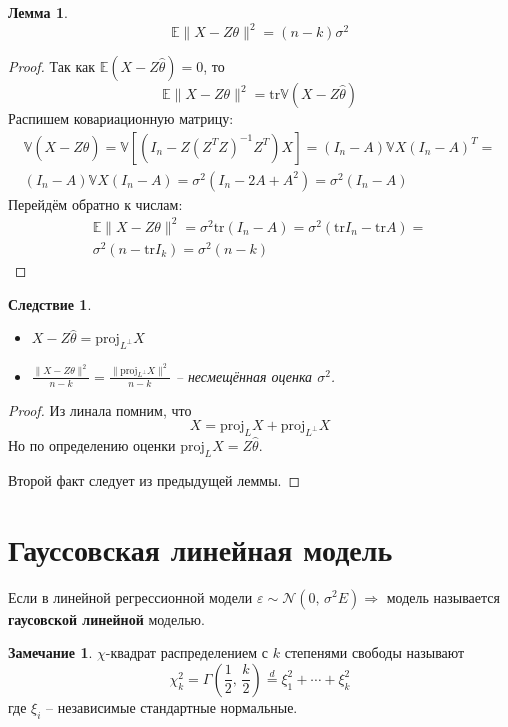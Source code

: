 \documentclass[a4paper,12pt]{article}
\theoremstyle{plain}
\newtheorem{lemma}{Лемма}[section]
\newtheorem*{corollary}{Следствие}
\theoremstyle{definition}
\newtheorem*{note}{Замечание}
\theoremstyle{remark}
\begin{document}
\begin{lemma}
  \[
    \mathbb{E}\|X - Z\theta\|^2 = (n - k)\sigma^2
  \]
\end{lemma}

\begin{proof}
  Так как $\mathbb{E}(X - Z\hat{\theta}) = 0$, то
  \[
    \mathbb{E}\|X - Z\theta\|^2 = \text{tr}\mathbb{V}(X - Z\hat{\theta})
  \]
  Распишем ковариационную матрицу:
  \begin{align*}
    \mathbb{V}(X - Z\hat{\theta}) = \mathbb{V}[(I_n - Z(Z^TZ)^{-1}Z^T)X]=(I_n - A)\mathbb{V}X(I_n - A)^T =\\
    (I_n - A)\mathbb{V}X(I_n - A) = \sigma^2(I_n - 2A + A^2) = \sigma^2(I_n - A)
  \end{align*}
  Перейдём обратно к числам:
  \begin{align*}
    \mathbb{E}\|X - Z\theta\|^2 = \sigma^2\text{tr}(I_n - A) = \sigma^2(\text{tr}I_n - \text{tr}A) =\\
    \sigma^2(n -  \text{tr}I_k) = \sigma^2(n - k)
  \end{align*}
\end{proof}

\begin{corollary}
  \begin{itemize}
    \item $X - Z\hat{\theta} = \text{proj}_{L^\bot}X$
    \item $\frac{\|X - Z\theta\|^2}{n - k} = \frac{\|\text{proj}_{L^\bot}X\|^2}{n - k}$ -- несмещённая оценка $\sigma^2$.
  \end{itemize}
\end{corollary}

\begin{proof}
  Из линала помним, что
  \[
    X = \text{proj}_LX + \text{proj}_{L^\bot}X
  \]
  Но по определению оценки $\text{proj}_LX = Z\hat{\theta}$.

  Второй факт следует из предыдущей леммы.
\end{proof}

\section{Гауссовская линейная модель}
Если в линейной регрессионной модели $\varepsilon \sim \mathcal{N}(0,\, \sigma^2E) \Rightarrow$ модель называется \textbf{гаусовской линейной} моделью.

\begin{note}
  $\chi$-квадрат распределением с $k$ степенями свободы называют
  \[
    \chi^2_k = \Gamma\left(\frac{1}{2},\,\frac{k}{2}\right) \overset{d}{=} \xi_1^2 + \cdots + \xi_k^2
  \]
  где $\xi_i$ -- независимые стандартные нормальные.
\end{note}
\end{document}
